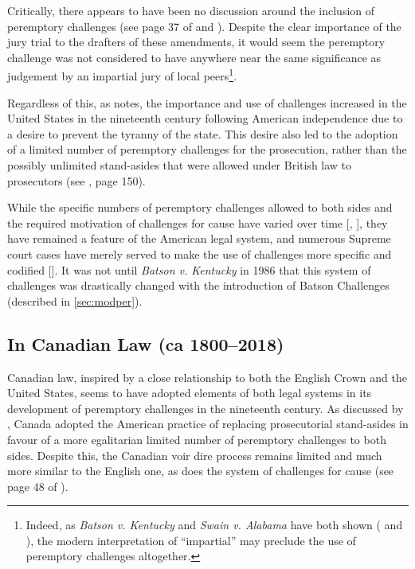 Critically, there appears to have been no discussion around the inclusion of peremptory challenges (see page 37 of
\cite{hansvidjudging} and \cite{hoffman1997}). Despite the clear importance of the jury trial to the drafters of these amendments,
it would seem the peremptory challenge was not considered to have anywhere near the same significance as judgement by an impartial
jury of local peers\footnote{Indeed, as \textit{Batson v. Kentucky} and \textit{Swain v. Alabama} have both shown
  (\cite{batsonvkentucky} and \cite{swainvalabama}), the modern interpretation of ``impartial'' may preclude the use of
  peremptory challenges altogether.}.

Regardless of this, as \cite{brown2000} notes, the importance and use of challenges increased in the United States in the
nineteenth century following American independence due to a desire to prevent the tyranny of the state. This desire also led to
the adoption of a limited number of peremptory challenges for the prosecution, rather than the possibly unlimited stand-asides
that were allowed under British law to prosecutors (see \cite{vandykejurysel}, page 150).

While the specific numbers of peremptory challenges allowed to both sides and the required motivation of challenges for cause have
varied over time [\cite{hoffman1997}, \cite{brown2000}], they have remained a feature of the American legal system, and
numerous Supreme court cases have merely served to make the use of challenges more specific and
codified [\cite{hoffman1997}]. It was not until \textit{Batson v. Kentucky} in 1986 that this system of challenges was drastically changed with the
introduction of Batson Challenges (described in \ref{sec:modper}).

\subsection{In Canadian Law (ca 1800--2018)}

Canadian law, inspired by a close relationship to both the English Crown and the United States, seems to have adopted elements of
both legal systems in its development of peremptory challenges in the nineteenth century. As discussed by \cite{brown2000}, Canada
adopted the American practice of replacing prosecutorial stand-asides in favour of a more egalitarian limited number of peremptory
challenges to both sides. Despite this, the Canadian voir dire process remains limited and much more similar to the English one,
as does the system of challenges for cause (see page 48 of \cite{hansvidjudging}).

